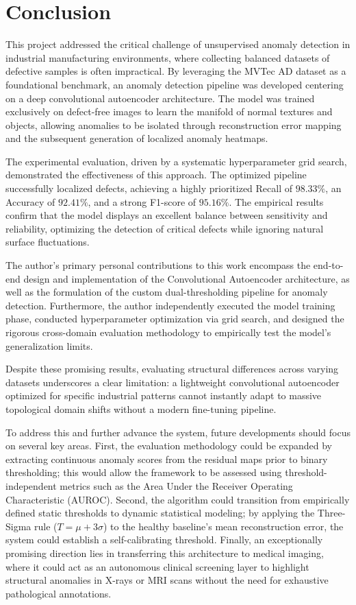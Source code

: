 \documentclass[10pt,twocolumn,a4paper]{article}
\begin{document}
\section{Conclusion}
	
This project addressed the critical challenge of unsupervised anomaly detection in industrial manufacturing environments, where collecting balanced datasets of defective samples is often impractical. By leveraging the MVTec AD dataset as a foundational benchmark, an anomaly detection pipeline was developed centering on a deep convolutional autoencoder architecture. The model was trained exclusively on defect-free images to learn the manifold of normal textures and objects, allowing anomalies to be isolated through reconstruction error mapping and the subsequent generation of localized anomaly heatmaps.

The experimental evaluation, driven by a systematic hyperparameter grid search, demonstrated the effectiveness of this approach. The optimized pipeline successfully localized defects, achieving a highly prioritized Recall of $98.33\%$, an Accuracy of $92.41\%$, and a strong F1-score of $95.16\%$. The empirical results confirm that the model displays an excellent balance between sensitivity and reliability, optimizing the detection of critical defects while ignoring natural surface fluctuations.

The author’s primary personal contributions to this work encompass the end-to-end design and implementation of the Convolutional Autoencoder architecture, as well as the formulation of the custom dual-thresholding pipeline for anomaly detection. Furthermore, the author independently executed the model training phase, conducted hyperparameter optimization via grid search, and designed the rigorous cross-domain evaluation methodology to empirically test the model's generalization limits.

Despite these promising results, evaluating structural differences across varying datasets underscores a clear limitation: a lightweight convolutional autoencoder optimized for specific industrial patterns cannot instantly adapt to massive topological domain shifts without a modern fine-tuning pipeline. 

To address this and further advance the system, future developments should focus on several key areas. First, the evaluation methodology could be expanded by extracting continuous anomaly scores from the residual maps prior to binary thresholding; this would allow the framework to be assessed using threshold-independent metrics such as the Area Under the Receiver Operating Characteristic (AUROC). Second, the algorithm could transition from empirically defined static thresholds to dynamic statistical modeling; by applying the Three-Sigma rule ($T = \mu + 3\sigma$) to the healthy baseline's mean reconstruction error, the system could establish a self-calibrating threshold. Finally, an exceptionally promising direction lies in transferring this architecture to medical imaging, where it could act as an autonomous clinical screening layer to highlight structural anomalies in X-rays or MRI scans without the need for exhaustive pathological annotations.
\end{document}
